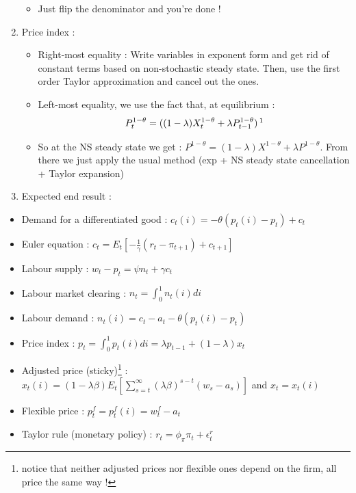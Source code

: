 \documentclass{article}
\begin{document}
\begin{enumerate}
\begin{itemize}
        \item Just flip the denominator and you're done ! 
    \end{itemize}
    \item Price index : 
        \begin{itemize}
            \item Right-most equality : Write variables in exponent form and get rid of constant terms based on non-stochastic steady state. Then, use the first order Taylor approximation and cancel out the ones.
            \item Left-most equality, we use the fact that, at equilibrium :
            \begin{equation}
                P_t^{1-\theta} = ((1-\lambda)X_t^{1-\theta} + \lambda P_{t-1}^{1-\theta}) \,\footnotemark
            \end{equation}
            \item So at the NS steady state we get : $P^{1-\theta} = (1-\lambda)X^{1-\theta} + \lambda P^{1-\theta}$. From there we just apply the usual method (exp + NS steady state cancellation + Taylor expansion)
        \end{itemize}
    \item Expected end result : 
\end{enumerate}
\begin{LLbox}
    \begin{itemize}
        \item Demand for a differentiated good : $c_t(i) = -\theta(p_t(i)-p_t)+c_t$
        \item Euler equation : $c_t = E_t[-\frac{1}{\gamma}(r_t-\pi_{t+1})+c_{t+1}]$
        \item Labour supply : $w_t-p_t = \psi n_t + \gamma c_t$
        \item Labour market clearing : $n_t = \int_0^1n_t(i)di$ 
        \item Labour demand : $n_t(i)=c_t-a_t-\theta(p_t(i)-p_t)$
        \item Price index : $p_t = \int_0^1p_t(i)di = \lambda p_{t-1} + (1-\lambda)x_t$
        \item Adjusted price (sticky)\footnote{notice that neither adjusted prices nor flexible ones depend on the firm, all price the same way !} : $x_t(i) = (1-\lambda\beta)E_t[\sum_{s=t}^\infty(\lambda\beta)^{s-t}(w_s-a_s)]$ and $x_t = x_t(i)$
        \item Flexible price : $p_t^f=p^f_t(i)=w_t^f-a_t$
        \item Taylor rule (monetary policy) : $r_t = \phi_{\pi}\pi_t+\epsilon_t^{r}$
    \end{itemize}
\end{LLbox}
\end{document}
